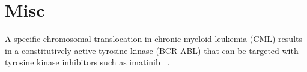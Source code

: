 
\chapter*{Misc}

A specific chromosomal translocation in 
chronic myeloid leukemia (CML) 
results in a constitutively active tyrosine-kinase (BCR-ABL)
that can be targeted with tyrosine kinase inhibitors such as imatinib~%
\autocite{drukerEfficacy2001}.


